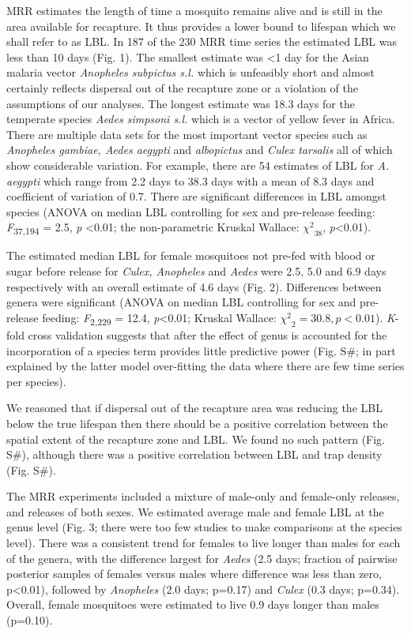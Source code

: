 \documentclass[]{article}
\begin{document}
MRR estimates the length of time a mosquito remains alive and is still
in the area available for recapture. It thus provides a lower bound to
lifespan which we shall refer to as LBL. In 187 of the 230 MRR time
series the estimated LBL was less than 10 days (Fig. 1). The smallest
estimate was \textless{}1 day for the Asian malaria vector
\emph{Anopheles subpictus s.l.} which is unfeasibly short and almost
certainly reflects dispersal out of the recapture zone or a violation of
the assumptions of our analyses. The longest estimate was 18.3 days for
the temperate species \emph{Aedes simpsoni s.l.} which is a vector of
yellow fever in Africa. There are multiple data sets for the most
important vector species such as \emph{Anopheles gambiae, Aedes aegypti}
and \emph{albopictus} and \emph{Culex tarsalis} all of which show
considerable variation. For example, there are 54 estimates of LBL for
\emph{A. aegypti} which range from 2.2 days to 38.3 days with a mean of
8.3 days and coefficient of variation of 0.7. There are significant
differences in LBL amongst species (ANOVA on median LBL controlling for
sex and pre-release feeding: \emph{F}\textsubscript{37,194} = 2.5,
\emph{p} \textless{}0.01; the non-parametric Kruskal Wallace:
\({\chi^{2}}_{38}\), \emph{p}\textless{}0.01).

The estimated median LBL for female mosquitoes not pre-fed with blood or
sugar before release for \emph{Culex, Anopheles} and \emph{Aedes} were
2.5, 5.0 and 6.9 days respectively with an overall estimate of 4.6 days
(Fig. 2). Differences between genera were significant (ANOVA on median
LBL controlling for sex and pre-release feeding:
\emph{F}\textsubscript{2,229} = 12.4, \emph{p}\textless{}0.01; Kruskal
Wallace: \({\chi^{2}}_{2} = 30.8,p < 0.01\)). \emph{K}-fold cross
validation suggests that after the effect of genus is accounted for the
incorporation of a species term provides little predictive power (Fig.
S\#; in part explained by the latter model over-fitting the data where
there are few time series per species).

We reasoned that if dispersal out of the recapture area was reducing the
LBL below the true lifespan then there should be a positive correlation
between the spatial extent of the recapture zone and LBL. We found no
such pattern (Fig. S\#), although there was a positive correlation
between LBL and trap density (Fig. S\#).

The MRR experiments included a mixture of male-only and female-only
releases, and releases of both sexes. We estimated average male and
female LBL at the genus level (Fig. 3; there were too few studies to
make comparisons at the species level). There was a consistent trend for
females to live longer than males for each of the genera, with the
difference largest for \emph{Aedes} (2.5 days; fraction of pairwise
posterior samples of females versus males where difference was less than
zero, p\textless{}0.01), followed by \emph{Anopheles} (2.0 days; p=0.17)
and \emph{Culex} (0.3 days; p=0.34). Overall, female mosquitoes were
estimated to live 0.9 days longer than males (p=0.10).
\end{document}
